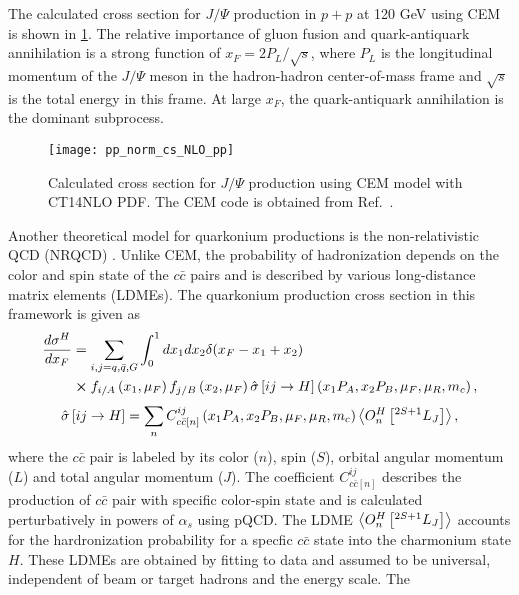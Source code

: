 \documentclass[../main.tex]{subfiles}
\begin{document}
The calculated cross section for $J/\Psi$ production in $p+p$ at 120 GeV using
CEM is shown in \cref{fig:cem_cs}. The relative importance of gluon fusion
and quark-antiquark annihilation is a strong function of $x_F=2P_L/\sqrt{s}$,
where $P_L$ is the longitudinal momentum of the $J/\Psi$ meson in the
hadron-hadron center-of-mass frame and $\sqrt{s}$ is the total energy in this
frame. At large $x_F$, the quark-antiquark annihilation is the dominant subprocess.
\begin{figure}[h!]
	\centering
	\texttt{[image: pp\_norm\_cs\_NLO\_pp]}
	\caption{Calculated cross section for $J/\Psi$ production using CEM model with CT14NLO PDF.
		The CEM code is obtained from Ref.~\cite{mangano1993}.}
	\label{fig:cem_cs}
\end{figure}

Another theoretical model for quarkonium productions is the non-relativistic
QCD (NRQCD) \cite{bodwin1995,bodwin1997}. Unlike CEM, the probability of
hadronization depends on the color and spin state of the $c\bar{c}$ pairs and
is described by various long-distance matrix elements (LDMEs). The quarkonium
production cross section in this framework is given as
\begin{equation}
	\begin{split}
		\frac{d\sigma^H}{dx_F} &=\sum_{i,j = q,\bar{q},G}\int^1_0 dx_1 dx_2 \delta(x_F-x_1+x_2)\\
		&\cross f_{i/A}\left(x_1,\mu_F\right)f_{j/B}\left(x_2,\mu_F\right)\hat{\sigma}\left[ij\rightarrow H\right]\left(x_1P_A,x_2P_B,\mu_F,\mu_R , m_c\right),
	\end{split}
\end{equation}
\begin{equation}
	\hat{\sigma}\left[ij\rightarrow H\right]= \sum_n C^{ij}_{c\bar{c}\left[n\right]}\left(x_1P_A,x_2P_B,\mu_F,\mu_R , m_c\right)\expval{O^H_n \left[^{2S+1}L_J\right]},
\end{equation}
where the $c\bar{c}$ pair is labeled by its color ($n$), spin ($S$), orbital
angular momentum ($L$) and total angular momentum ($J$). The coefficient
$C^{ij}_{c\bar{c}\left[n\right]}$ describes the production of $c\bar{c}$ pair
with specific color-spin state and is calculated perturbatively in powers of
$\alpha_s$ using pQCD. The LDME $\expval{O^H_n \left[^{2S+1}L_J\right]}$ accounts
for the hardronization probability for a specfic $c\bar{c}$ state into the
charmonium state $H$. These LDMEs are obtained by fitting to data and assumed to
be universal, independent of beam or target hadrons and the energy scale. The
\end{document}
